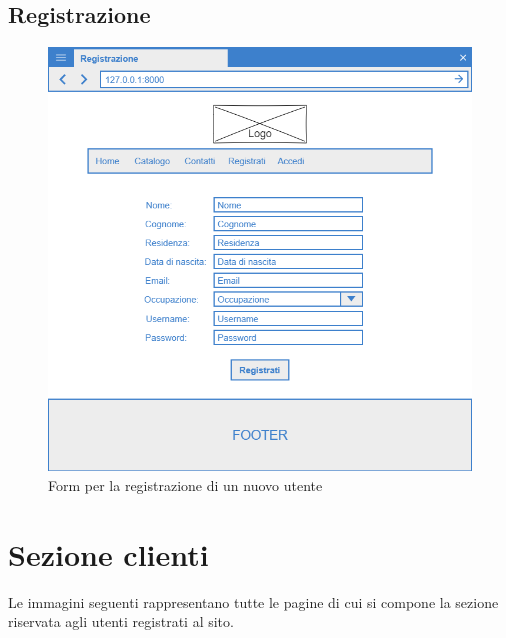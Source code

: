 \documentclass[12pt,a4paperS]{report}
\begin{document}
\begin{normalsize}
			\subsection{Registrazione}
				\begin{figure}[H]
					\centering
					\includegraphics[width=1\textwidth, height=1\textheight, keepaspectratio]{Mockup/Registrazione.png}
					\caption{Form per la registrazione di un nuovo utente}
				\end{figure}
		
		\section{Sezione clienti}
			Le immagini seguenti rappresentano tutte le pagine di cui si compone la sezione riservata agli utenti registrati al sito.
			

\end{normalsize}
\end{document}
